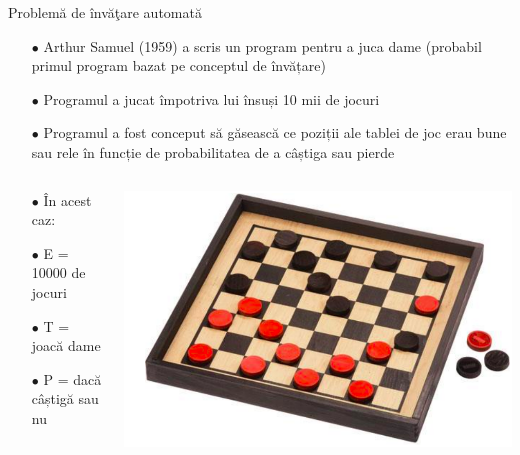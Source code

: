 \documentclass{beamer}
\begin{document}
\begin{frame}{Problemă  de învăţare automată}
\begin{itemize}
	\item[$\bullet$] Arthur Samuel (1959) a scris un program pentru a juca dame (probabil primul program bazat pe conceptul de învățare)
	\item[$\bullet$] Programul a jucat împotriva lui însuși 10 mii de jocuri
	\item[$\bullet$] Programul a fost conceput să găsească ce poziții ale tablei de joc erau bune sau rele în funcție de probabilitatea de a câștiga sau pierde
\end{itemize}

\begin{columns}
\begin{column}{0.5\textwidth}
	\begin{itemize}
		\item[$\bullet$] În acest caz:
		\item[$\bullet$] E = 10000 de jocuri
		\item[$\bullet$] T = joacă dame
		\item[$\bullet$] P = dacă câștigă sau nu
	\end{itemize}
\end{column}
\begin{column}{0.4\textwidth}
    \begin{center}
	\includegraphics[scale=.15]{pic3.png}
     \end{center}
\end{column}
\end{columns}
\end{frame}
\end{document}
